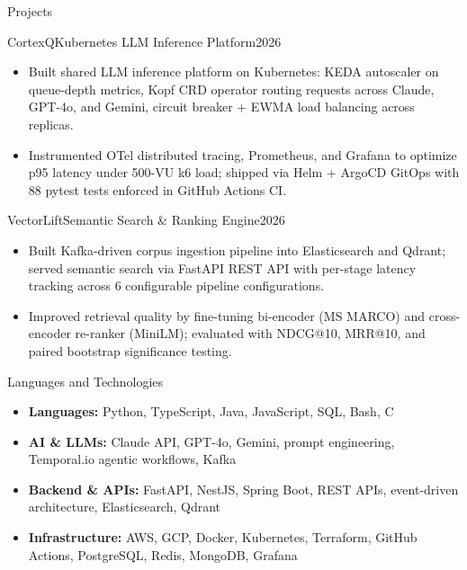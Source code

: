 \documentclass[]{mcdowellcv}
\begin{document}
\begin{cvsection}{Projects}
  \begin{cvsubsection}{CortexQ}{Kubernetes LLM Inference Platform}{2026}
    \begin{itemize}
      \item Built shared LLM inference platform on Kubernetes: KEDA autoscaler on queue-depth metrics, Kopf CRD operator routing requests across Claude, GPT-4o, and Gemini, circuit breaker + EWMA load balancing across replicas.
      \item Instrumented OTel distributed tracing, Prometheus, and Grafana to optimize p95 latency under 500-VU k6 load; shipped via Helm + ArgoCD GitOps with 88 pytest tests enforced in GitHub Actions CI.
    \end{itemize}
    \vspace{-1.5pt}
  \end{cvsubsection}

  \begin{cvsubsection}{VectorLift}{Semantic Search \& Ranking Engine}{2026}
    \begin{itemize}
      \item Built Kafka-driven corpus ingestion pipeline into Elasticsearch and Qdrant; served semantic search via FastAPI REST API with per-stage latency tracking across 6 configurable pipeline configurations.
      \item Improved retrieval quality by fine-tuning bi-encoder (MS MARCO) and cross-encoder re-ranker (MiniLM); evaluated with NDCG@10, MRR@10, and paired bootstrap significance testing.
    \end{itemize}
    \vspace{-1.5pt}
  \end{cvsubsection}

\end{cvsection}

\begin{cvsection}{Languages and Technologies}
  \begin{cvsubsection}{}{}{}
    \begin{itemize}
      \item \textbf{Languages:} Python, TypeScript, Java, JavaScript, SQL, Bash, C
      \item \textbf{AI \& LLMs:} Claude API, GPT-4o, Gemini, prompt engineering, Temporal.io agentic workflows, Kafka
      \item \textbf{Backend \& APIs:} FastAPI, NestJS, Spring Boot, REST APIs, event-driven architecture, Elasticsearch, Qdrant
      \item \textbf{Infrastructure:} AWS, GCP, Docker, Kubernetes, Terraform, GitHub Actions, PostgreSQL, Redis, MongoDB, Grafana
    \end{itemize}
  \end{cvsubsection}
\end{cvsection}
\end{document}
